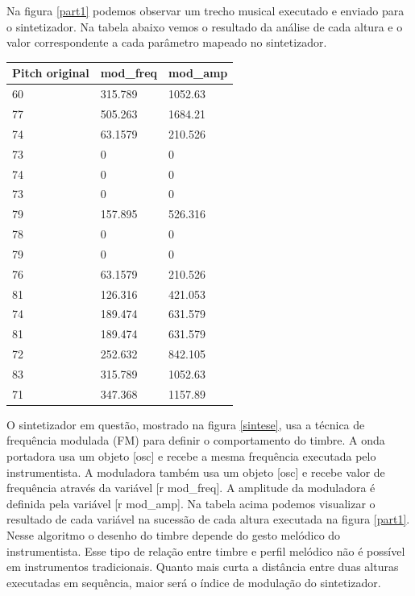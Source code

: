 \documentclass{ppgmus}
\begin{document}
Na figura \ref{part1} podemos observar um trecho musical executado e enviado para
o sintetizador. Na tabela abaixo vemos o resultado da análise de cada altura e o 
valor correspondente a cada parâmetro mapeado no sintetizador.

\pagebreak
\singlespacing
\begin{center}
    \begin{tabular}{ | l | l | p{5cm} |}
    \hline
    Pitch original & mod\_freq & mod\_amp \\ \hline
    60 & 315.789 & 1052.63  \\ \hline
    77 & 505.263 & 1684.21  \\ \hline
     74 & 63.1579 & 210.526  \\ \hline
    73 & 0 & 0 \\ \hline
    74 & 0 & 0 \\ \hline
    73 & 0  & 0 \\ \hline
    79 & 157.895 & 526.316 \\ \hline
    78 &  0 & 0 \\ \hline
    79 & 0 & 0 \\ \hline
    76 & 63.1579 & 210.526 \\ \hline
    81 & 126.316 & 421.053 \\ \hline
    74 & 189.474 & 631.579 \\ \hline
   81 & 189.474 & 631.579 \\ \hline
   72 & 252.632 & 842.105 \\ \hline
  83 & 315.789 & 1052.63 \\ \hline
   71 & 347.368 & 1157.89 \\ \hline
    \hline
    \end{tabular}
\label{tabela-variaveis}
\end{center}
\doublespacing

O sintetizador em questão, mostrado na figura \ref{sintese}, usa a técnica
de frequência modulada (FM) para definir o comportamento do timbre.
A onda portadora usa um objeto [osc\texttildelow] e recebe a mesma frequência executada pelo instrumentista.
A moduladora também usa um objeto [osc\texttildelow] e recebe valor de frequência através
da variável [r mod\_freq]. A amplitude da moduladora é definida pela variável [r mod\_amp].
Na tabela acima podemos visualizar o resultado de cada variável na sucessão de cada altura executada
na figura \ref{part1}. Nesse algoritmo o desenho do timbre depende do gesto melódico do instrumentista.
Esse tipo de relação entre timbre e perfil melódico não é possível em instrumentos tradicionais.
Quanto mais curta a distância entre duas alturas executadas em sequência, maior será o índice de 
modulação do sintetizador.
\end{document}
